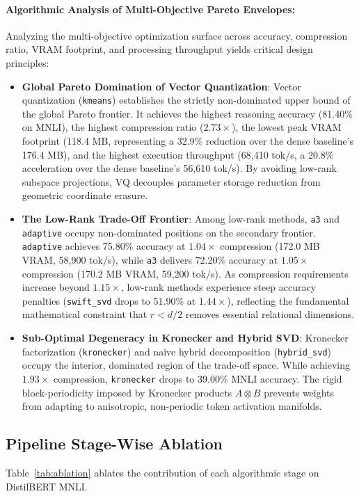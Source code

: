 \documentclass{article}
\begin{document}
\paragraph{Algorithmic Analysis of Multi-Objective Pareto Envelopes:}
Analyzing the multi-objective optimization surface across accuracy, compression ratio, VRAM footprint, and processing throughput yields critical design principles:
\begin{itemize}
    \item \textbf{Global Pareto Domination of Vector Quantization}: Vector quantization (\texttt{kmeans}) establishes the strictly non-dominated upper bound of the global Pareto frontier. It achieves the highest reasoning accuracy (81.40\% on MNLI), the highest compression ratio ($2.73\times$), the lowest peak VRAM footprint (118.4 MB, representing a 32.9\% reduction over the dense baseline's 176.4 MB), and the highest execution throughput (68,410 tok/s, a 20.8\% acceleration over the dense baseline's 56,610 tok/s). By avoiding low-rank subspace projections, VQ decouples parameter storage reduction from geometric coordinate erasure.
    \item \textbf{The Low-Rank Trade-Off Frontier}: Among low-rank methods, \texttt{a3} and \texttt{adaptive} occupy non-dominated positions on the secondary frontier. \texttt{adaptive} achieves 75.80\% accuracy at $1.04\times$ compression (172.0 MB VRAM, 58,900 tok/s), while \texttt{a3} delivers 72.20\% accuracy at $1.05\times$ compression (170.2 MB VRAM, 59,200 tok/s). As compression requirements increase beyond $1.15\times$, low-rank methods experience steep accuracy penalties (\texttt{swift\_svd} drops to 51.90\% at $1.44\times$), reflecting the fundamental mathematical constraint that $r < d/2$ removes essential relational dimensions.
    \item \textbf{Sub-Optimal Degeneracy in Kronecker and Hybrid SVD}: Kronecker factorization (\texttt{kronecker}) and naive hybrid decomposition (\texttt{hybrid\_svd}) occupy the interior, dominated region of the trade-off space. While achieving $1.93\times$ compression, \texttt{kronecker} drops to 39.00\% MNLI accuracy. The rigid block-periodicity imposed by Kronecker products $A \otimes B$ prevents weights from adapting to anisotropic, non-periodic token activation manifolds.
\end{itemize}

\subsection{Pipeline Stage-Wise Ablation}
Table~\ref{tab:ablation} ablates the contribution of each algorithmic stage on DistilBERT MNLI.
\end{document}
